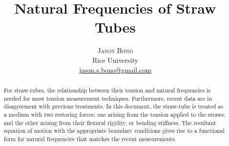 \documentclass[twoside]{article}
\title{\vspace{-15mm}\fontsize{24pt}{10pt}\selectfont\textbf{Natural Frequencies of Straw Tubes}} %
\author{
\large
\textsc{Jason Bono}\\[2mm] %
\normalsize Rice University \\ %
\normalsize \href{mailto:jason.s.bono@gmail.com}{jason.s.bono@gmail.com} %
\vspace{-5mm}
}
\date{}
\begin{document}
\maketitle %

\thispagestyle{fancy} %


\begin{abstract}

\noindent For straw-tubes, the relationship between their tension and natural frequencies is needed for most tension measurement techniques.  Furthermore, recent data are in disagreement with previous treatments.  In this document, the straw-tube is treated as a medium with two restoring forces; one arising from the tension applied to the straws, and the other arising from their flexural rigidity, or bending stiffness. The resultant equation of motion with the appropriate boundary conditions gives rise to a functional form for natural frequencies that matches the recent measurements.  %

\end{abstract}

\end{document}
